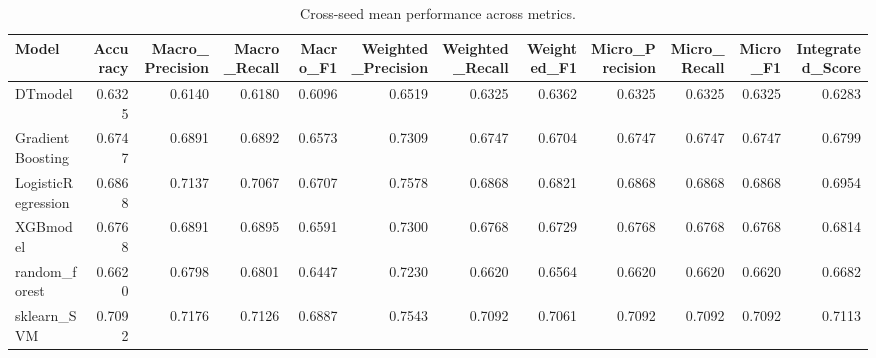 \begin{table}[t]
\centering
\begin{tabular}{lrrrrrrrrrrr}
\toprule
Model & Accuracy & Macro_Precision & Macro_Recall & Macro_F1 & Weighted_Precision & Weighted_Recall & Weighted_F1 & Micro_Precision & Micro_Recall & Micro_F1 & Integrated_Score \\
\midrule
DTmodel & 0.6325 & 0.6140 & 0.6180 & 0.6096 & 0.6519 & 0.6325 & 0.6362 & 0.6325 & 0.6325 & 0.6325 & 0.6283 \\
GradientBoosting & 0.6747 & 0.6891 & 0.6892 & 0.6573 & 0.7309 & 0.6747 & 0.6704 & 0.6747 & 0.6747 & 0.6747 & 0.6799 \\
LogisticRegression & 0.6868 & 0.7137 & 0.7067 & 0.6707 & 0.7578 & 0.6868 & 0.6821 & 0.6868 & 0.6868 & 0.6868 & 0.6954 \\
XGBmodel & 0.6768 & 0.6891 & 0.6895 & 0.6591 & 0.7300 & 0.6768 & 0.6729 & 0.6768 & 0.6768 & 0.6768 & 0.6814 \\
random_forest & 0.6620 & 0.6798 & 0.6801 & 0.6447 & 0.7230 & 0.6620 & 0.6564 & 0.6620 & 0.6620 & 0.6620 & 0.6682 \\
sklearn_SVM & 0.7092 & 0.7176 & 0.7126 & 0.6887 & 0.7543 & 0.7092 & 0.7061 & 0.7092 & 0.7092 & 0.7092 & 0.7113 \\
\bottomrule
\end{tabular}
\caption{Cross-seed mean performance across metrics.}
\label{tab:cross_seed_mean}
\end{table}